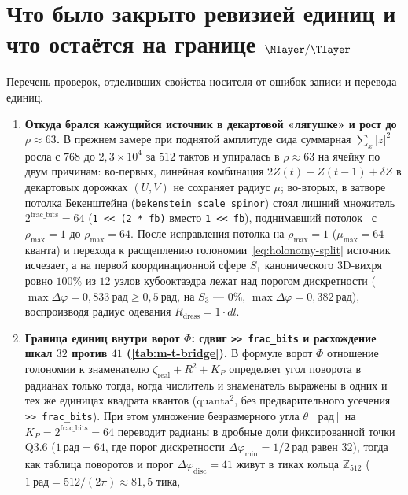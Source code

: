 \section{Что было закрыто ревизией единиц и что остаётся на границе \texorpdfstring{$\Mlayer/\Tlayer$}{M/T}}

Перечень проверок, отделивших свойства носителя от ошибок записи и перевода единиц.

\begin{enumerate}[leftmargin=*]
\item \textbf{Откуда брался кажущийся источник в декартовой «лягушке» и рост до $\rho\approx 63$.}
  В прежнем замере при поднятой амплитуде сида суммарная $\sum_x|z|^2$ росла
  с $768$ до $2{,}3\times10^{4}$ за $512$ тактов и упиралась в $\rho\approx 63$ на ячейку по двум причинам:
  во-первых, линейная комбинация $2Z(t)-Z(t-1)+\delta Z$ в декартовых дорожках $(U,V)$ не сохраняет
  радиус $\mu$; во-вторых, в затворе потолка Бекенштейна (\texttt{bekenstein\_scale\_spinor})
  стоял лишний множитель $2^{\mathrm{frac\_bits}}=64$ (\texttt{1 << (2 * fb)} вместо \texttt{1 << fb}),
  поднимавший потолок~ с $\rho_{\max}=1$ до $\rho_{\max}=64$.
  После исправления потолка на $\rho_{\max}=1$ ($\mu_{\max}=64$ кванта) и перехода к расщеплению
  голономии~\eqref{eq:holonomy-split} источник исчезает, а на первой координационной сфере $S_1$
  канонического 3D-вихря ровно $100\%$ из $12$ узлов кубооктаэдра лежат над порогом дискретности
  ($\max\Delta\varphi = 0{,}833\ \text{рад} \ge 0{,}5\ \text{рад}$, на $S_3$ --- $0\%$, $\max\Delta\varphi = 0{,}382\ \text{рад}$),
  воспроизводя радиус одевания $R_{\mathrm{dress}}=1\cdot dl$.
\item \textbf{Граница единиц внутри ворот $\Phi$: сдвиг \texttt{>> frac\_bits} и расхождение шкал $32$ против $41$ (\cref{tab:m-t-bridge}).}
  В формуле ворот $\Phi$ отношение голономии к знаменателю $\zeta_{\mathrm{real}} + R^2 + K_P$
  определяет угол поворота в радианах только тогда, когда числитель и знаменатель выражены
  в одних и тех же единицах квадрата квантов ($\mathrm{quanta}^2$, без предварительного усечения \texttt{>> frac\_bits}).
  При этом умножение безразмерного угла $\theta\ [\text{рад}]$ на $K_P = 2^{\mathrm{frac\_bits}} = 64$
  переводит радианы в дробные доли фиксированной точки Q3.6 ($1\ \text{рад} = 64$, где порог дискретности
  $\Delta\varphi_{\min}=1/2\ \text{рад}$ равен $32$), тогда как таблица поворотов и порог
  $\Delta\varphi_{\mathrm{disc}} = 41$ живут в тиках кольца $\mathbb{Z}_{512}$ ($1\ \text{рад} = 512/(2\pi)\approx 81{,}5$ тика,

\end{enumerate}
